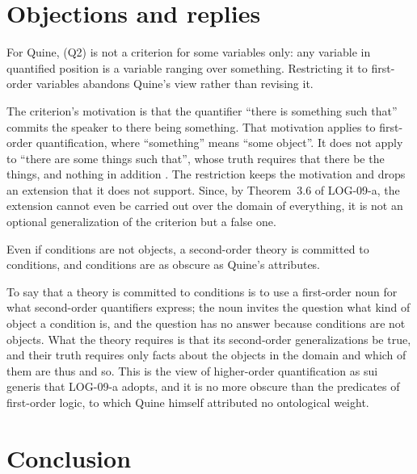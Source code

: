\documentclass{situationist-preprint}
\begin{document}
\section{Objections and replies}

\begin{objection}
For Quine, (Q2) is not a criterion for some variables only: any variable in quantified position is a variable ranging over something. Restricting it to first-order variables abandons Quine's view rather than revising it.
\end{objection}

\begin{reply}
The criterion's motivation is that the quantifier \enquote{there is something such that} commits the speaker to there being something. That motivation applies to first-order quantification, where \enquote{something} means \enquote{some object}. It does not apply to \enquote{there are some things such that}, whose truth requires that there be the things, and nothing in addition \citep{Boolos1984}. The restriction keeps the motivation and drops an extension that it does not support. Since, by Theorem~3.6 of LOG-09-a, the extension cannot even be carried out over the domain of everything, it is not an optional generalization of the criterion but a false one.
\end{reply}

\begin{objection}
Even if conditions are not objects, a second-order theory is committed to conditions, and conditions are as obscure as Quine's attributes.
\end{objection}

\begin{reply}
To say that a theory is committed to conditions is to use a first-order noun for what second-order quantifiers express; the noun invites the question what kind of object a condition is, and the question has no answer because conditions are not objects. What the theory requires is that its second-order generalizations be true, and their truth requires only facts about the objects in the domain and which of them are thus and so. This is the view of higher-order quantification as sui generis that LOG-09-a adopts, and it is no more obscure than the predicates of first-order logic, to which Quine himself attributed no ontological weight.
\end{reply}

\section{Conclusion}
\end{document}
